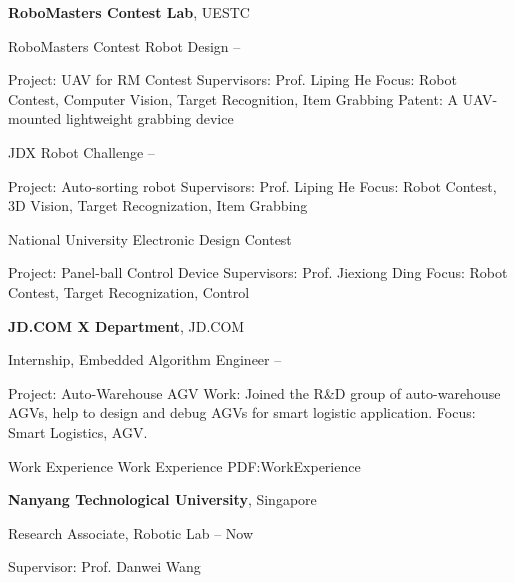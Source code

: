 \documentclass[letterpaper,MMMyyyy,nonstopmode]{simpleresumecv}
\begin{document}
\begin{Body}
\Gap
\Entry
{\textbf{RoboMasters Contest Lab}},
UESTC

\BulletItem
RoboMasters Contest Robot Design
\hfill
{} --
\begin{Detail}
	\SubBulletItem
	Project:
	UAV for RM Contest
	\SubBulletItem
	Supervisors:
	Prof. Liping He
	\SubBulletItem
	Focus:
	Robot Contest, Computer Vision, Target Recognition, Item Grabbing
	\SubBulletItem
	Patent:
	A UAV-mounted lightweight grabbing device\cite{yijie2016}
	
\end{Detail}

\BulletItem
JDX Robot Challenge \cite{lxyjd2017}
\hfill
{} --
\begin{Detail}
	\SubBulletItem
	Project:
	Auto-sorting robot
	\SubBulletItem
	Supervisors:
	Prof. Liping He
	\SubBulletItem
	Focus:
	Robot Contest, 3D Vision, Target Recognization, Item Grabbing
\end{Detail}

\BulletItem
National University Electronic Design Contest
\hfill
{} 
\begin{Detail}
	\SubBulletItem
	Project:
	Panel-ball Control Device
	\SubBulletItem
	Supervisors:
	Prof. Jiexiong Ding
	\SubBulletItem
	Focus:
	Robot Contest, Target Recognization, Control
\end{Detail}

\newpage
\Entry
{\textbf{JD.COM X Department}}, JD.COM

\BulletItem
Internship, Embedded Algorithm Engineer
\hfill
{} --
\begin{Detail}
	\SubBulletItem
	Project:
	Auto-Warehouse AGV
	\SubBulletItem
	Work: Joined the R\&D group of auto-warehouse AGVs, help to design and debug AGVs for smart logistic application.
	\SubBulletItem
	Focus:
	Smart Logistics, AGV.
\end{Detail}


\Section
{Work\newline
	Experience}
{Work Experience}
{PDF:WorkExperience}

\Entry
{\textbf{Nanyang Technological University}},
Singapore

\BulletItem
Research Associate,
Robotic Lab
\hfill
{} --
Now
\begin{Detail}
	\SubBulletItem
	Supervisor:
	Prof. Danwei Wang
\end{Detail}


\end{Body}
\end{document}
